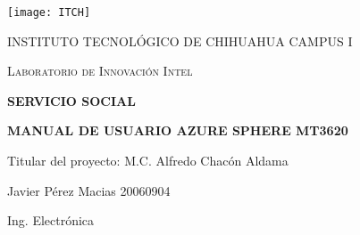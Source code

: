 \begin{titlepage}
	\centering
	\texttt{[image: ITCH]}\par\vspace{1cm}
	{\textsc{INSTITUTO TECNOLÓGICO DE CHIHUAHUA CAMPUS I} \par}
	\vspace{0.5cm}
	{\textsc{Laboratorio de Innovación Intel} \par}
	\vspace{1cm}
	\vspace{1.5cm}
	{\huge\bfseries SERVICIO SOCIAL\par}
	{\huge\bfseries MANUAL DE USUARIO AZURE SPHERE MT3620 \par}
	\vspace{2cm}
	{\Large Titular del proyecto: M.C. Alfredo Chacón Aldama\par}
	\vspace{2cm}
	{\Large Javier Pérez Macias 20060904\par}
	{\Large Ing. Electrónica\par}
	\vfill
\end{titlepage}